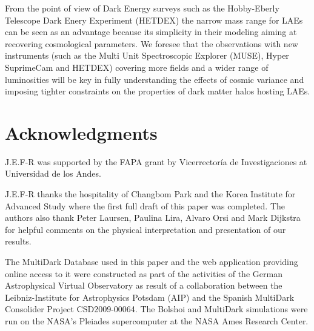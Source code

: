 \documentclass{emulateapj}
\begin{document}
From the point of view of Dark Energy surveys such as the Hobby-Eberly
Telescope Dark Enery Experiment (HETDEX) the narrow mass range for
LAEs can be seen as an advantage because its simplicity in their
modeling aiming at recovering cosmological parameters. We foresee that
the observations with new instruments (such as the Multi Unit
Spectroscopic Explorer (MUSE), Hyper SuprimeCam and HETDEX) covering
more fields and a wider range of luminosities will be key in fully
understanding the effects of cosmic variance  and imposing tighter
constraints on the properties of dark matter halos hosting LAEs. 



\section*{Acknowledgments} 

J.E.F-R was supported by the FAPA grant by Vicerrector\'ia de
Investigaciones at Universidad de los Andes.  

J.E.F-R thanks the hospitality of Changbom Park and the Korea
Institute for Advanced Study where the first full draft of this paper
was completed. The authors also thank Peter Laursen, Paulina Lira, 
Alvaro Orsi and Mark Dijkstra for helpful comments on the physical
interpretation and presentation of our results. 


The MultiDark Database used in this paper and the web application
providing online access to it were constructed as part of the
activities of the German Astrophysical Virtual Observatory as result
of a collaboration between the Leibniz-Institute for Astrophysics
Potsdam (AIP) and the Spanish MultiDark Consolider Project
CSD2009-00064. The Bolshoi and MultiDark simulations were run on the
NASA's Pleiades supercomputer at the NASA Ames Research Center. 
\end{document}
